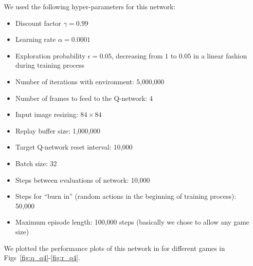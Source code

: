 \documentclass{article}
\begin{document}
We used the following hyper-parameters for this network:
\begin{itemize}
  \item Discount factor $\gamma=0.99$
  \item Learning rate $\alpha=0.0001$
  \item Exploration probability $\epsilon=0.05$, decreasing from $1$ to $0.05$ in a linear fashion during training process
  \item Number of iterations with environment: 5,000,000
  \item Number of frames to feed to the Q-network: 4
  \item Input image resizing: $84\times84$
  \item Replay buffer size: 1,000,000
  \item Target Q-network reset interval: 10,000
  \item Batch size: 32
  \item Steps between evaluations of network: 10,000
  \item Steps for ``burn in'' (random actions in the beginning of training process): 50,000
  \item Maximum episode length: 100,000 steps (basically we chose to allow any game size)
\end{itemize}

We plotted the performance plots of this network in for different games in Figs~\ref{fig:q_q4}-\ref{fig:r_q4}.



\end{document}

